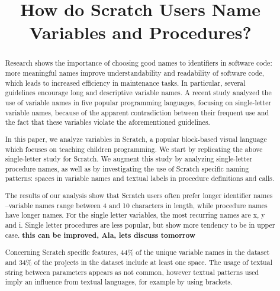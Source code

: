\documentclass[conference]{IEEEtran}
\newcommand{\todo}[1]{ \textbf{#1} }
\begin{document}
\title{How do Scratch Users Name Variables and Procedures? }

\author{
\and
{}
}
\maketitle

\begin{abstract}
Research shows the importance of choosing good names to identifiers in software code: more meaningful names improve understandability and readability of software code, which leads to increased efficiency in maintenance tasks. 
In particular, several guidelines encourage long and descriptive variable names.
A recent study analyzed the use of variable names in five popular programming languages, focusing on single-letter variable names, because of the apparent contradiction between their frequent use and the fact that these variables violate the aforementioned guidelines.

In this paper, we analyze variables in Scratch, a popular block-based visual language which focuses on teaching children programming. We start by replicating the above single-letter study for Scratch. 
We augment this study by analyzing single-letter procedure names, as well as by investigating the use of Scratch specific naming patterns: spaces in variable names and textual labels in procedure definitions and calls.

The results of our analysis show that Scratch users often prefer longer identifier names --variable names range between 4 and 10 characters in length, while procedure names have longer names. For the single letter variables, the most recurring names are x, y and i. Single letter procedures are less popular, but show more tendency to be in upper case. \todo{this can be improved, Ala, lets discuss tomorrow}

Concerning Scratch specific features, 44\% of the unique variable names in the dataset and 34\% of the projects in the dataset include at least one space. The usage of textual string between parameters appears as not common, however textual patterns used imply an influence from textual languages, for example by using brackets. 


\end{abstract}
\end{document}
